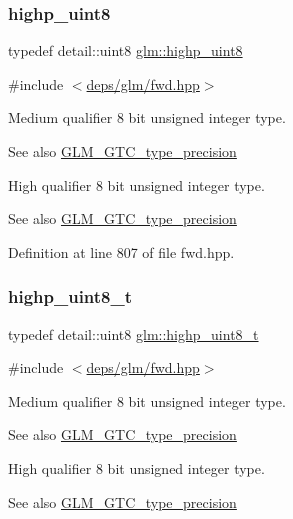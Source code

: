 \subsubsection{\texorpdfstring{highp\+\_\+uint8}{highp\_uint8}}
{\footnotesize\ttfamily typedef detail\+::uint8 \hyperlink{group__gtc__type__precision_ga2c27c6dd26e893786f04b10f99c1ee95}{glm\+::highp\+\_\+uint8}}



{\ttfamily \#include $<$\hyperlink{fwd_8hpp}{deps/glm/fwd.\+hpp}$>$}

Medium qualifier 8 bit unsigned integer type. \begin{DoxySeeAlso}{See also}
\hyperlink{group__gtc__type__precision}{G\+L\+M\+\_\+\+G\+T\+C\+\_\+type\+\_\+precision}
\end{DoxySeeAlso}
High qualifier 8 bit unsigned integer type. \begin{DoxySeeAlso}{See also}
\hyperlink{group__gtc__type__precision}{G\+L\+M\+\_\+\+G\+T\+C\+\_\+type\+\_\+precision} 
\end{DoxySeeAlso}


Definition at line 807 of file fwd.\+hpp.

\mbox{\label{group__gtc__type__precision_ga9ba529fcc75b82d23da979f0ce6e4518}} 
\subsubsection{\texorpdfstring{highp\+\_\+uint8\+\_\+t}{highp\_uint8\_t}}
{\footnotesize\ttfamily typedef detail\+::uint8 \hyperlink{group__gtc__type__precision_ga9ba529fcc75b82d23da979f0ce6e4518}{glm\+::highp\+\_\+uint8\+\_\+t}}



{\ttfamily \#include $<$\hyperlink{fwd_8hpp}{deps/glm/fwd.\+hpp}$>$}

Medium qualifier 8 bit unsigned integer type. \begin{DoxySeeAlso}{See also}
\hyperlink{group__gtc__type__precision}{G\+L\+M\+\_\+\+G\+T\+C\+\_\+type\+\_\+precision}
\end{DoxySeeAlso}
High qualifier 8 bit unsigned integer type. \begin{DoxySeeAlso}{See also}
\hyperlink{group__gtc__type__precision}{G\+L\+M\+\_\+\+G\+T\+C\+\_\+type\+\_\+precision} 
\end{DoxySeeAlso}


